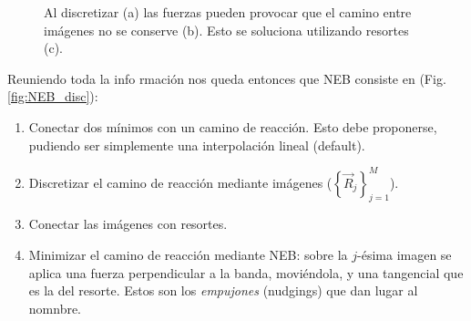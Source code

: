   \begin{figure}[H]
      \centering
      \caption{Al discretizar (a) las fuerzas pueden provocar que el camino entre imágenes no se conserve (b). Esto se soluciona utilizando resortes (c).}
      \label{fig:disc}
  \end{figure}

  Reuniendo toda la info rmación nos queda entonces que NEB consiste en (Fig. \ref{fig:NEB_disc}):
    \begin{enumerate}
      \item Conectar dos mínimos con un camino de reacción. Esto debe proponerse, pudiendo ser simplemente una interpolación lineal (default).
      \item Discretizar el camino de reacción mediante imágenes ($\left\{ \vec{R}_j \right\}_{j=1}^M$).
      \item Conectar las imágenes con resortes.
      \item Minimizar el camino de reacción mediante NEB: sobre la $j$-ésima imagen se aplica una fuerza perpendicular a la banda, moviéndola, y una tangencial que es la del resorte. Estos son los \emph{empujones} (nudgings) que dan lugar al nomnbre.
    \end{enumerate}

